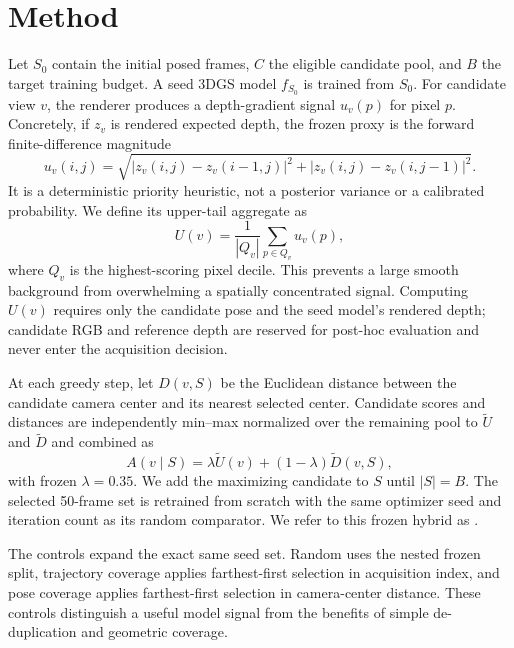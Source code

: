 \section{Method}

Let $S_0$ contain the initial posed frames, $C$ the eligible candidate pool, and
$B$ the target training budget.  A seed 3DGS model $f_{S_0}$ is trained from
$S_0$.  For candidate view $v$, the renderer produces a depth-gradient signal
$u_v(p)$ for pixel $p$.  Concretely, if $z_v$ is rendered expected depth, the
frozen proxy is the forward finite-difference magnitude
\begin{equation}
u_v(i,j)=\sqrt{|z_v(i,j)-z_v(i-1,j)|^2+|z_v(i,j)-z_v(i,j-1)|^2}.
\end{equation}
It is a deterministic priority heuristic, not a posterior variance or a
calibrated probability.  We define its upper-tail aggregate as
\begin{equation}
U(v)=\frac{1}{|Q_v|}\sum_{p\in Q_v}u_v(p),
\end{equation}
where $Q_v$ is the highest-scoring pixel decile.  This prevents a large smooth
background from overwhelming a spatially concentrated signal.  Computing
$U(v)$ requires only the candidate pose and the seed model's rendered depth;
candidate RGB and reference depth are reserved for post-hoc evaluation and
never enter the acquisition decision.

At each greedy step, let $D(v,S)$ be the Euclidean distance between the
candidate camera center and its nearest selected center.  Candidate scores and
distances are independently min--max normalized over the remaining pool to
$\widetilde U$ and $\widetilde D$ and combined as
\begin{equation}
A(v\mid S)=\lambda\widetilde U(v)+(1-\lambda)\widetilde D(v,S),
\end{equation}
with frozen $\lambda=0.35$.  We add the maximizing candidate to $S$ until
$|S|=B$.  The selected 50-frame set is retrained from scratch with the same
optimizer seed and iteration count as its random comparator.
We refer to this frozen hybrid as \method.

The controls expand the exact same seed set.  Random uses the nested frozen
split, trajectory coverage applies farthest-first selection in acquisition
index, and pose coverage applies farthest-first selection in camera-center
distance.  These controls distinguish a useful model signal from the benefits
of simple de-duplication and geometric coverage.
